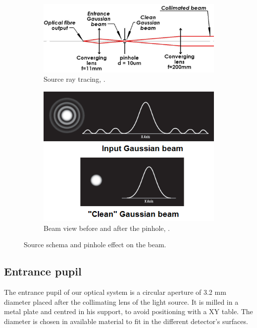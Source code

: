\begin{figure}
\centering
    \begin{subfigure}{0.5\textwidth}
        \includegraphics[width=\textwidth]{Figures/source.png}
        \caption{Source ray tracing, \citep{Bouxin_PDM}.}
        \label{fig:sourceRayTracing}
    \end{subfigure}
    \quad
    \begin{subfigure}{0.3\textwidth}
        \includegraphics[width=\textwidth]{Figures/pinholeEffect.png}
        \caption{Beam view before and after the pinhole, \citep{SpatialFilters}.}
        \label{fig:pinholeEffect}
    \end{subfigure}
    \decoRule
    \caption{Source schema and pinhole effect on the beam.}
\end{figure}

\subsection{Entrance pupil}
\label{subsec:EntrancePupil}

The entrance pupil of our optical system is a circular aperture of 3.2 mm diameter placed after the collimating lens of the light source. It is milled in a metal plate and centred in his support, to avoid positioning with a XY table. The diameter is chosen in available material to fit in the different detector's surfaces.

